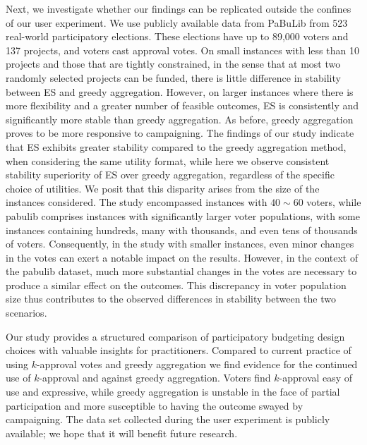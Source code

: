\documentclass[mnsc,blindrev]{informs3_freeuse} %
\newcommand{\mes}{ES}
\newcommand{\pabu}{PaBuLib}
\begin{document}
Next, we investigate whether our findings  can be replicated outside the confines of our user experiment. We use publicly available data from \pabu{} from 523 real-world participatory elections. These elections have up to 89,000 voters and 137 projects, and voters cast approval votes.  
On small instances with less than 10 projects and those that are tightly constrained, in the sense that at most two randomly selected projects can be funded, there is little difference in stability between \mes{} and greedy aggregation. However, on larger instances where there is more flexibility and a greater number of feasible outcomes, \mes{} is consistently and significantly more stable than greedy aggregation. As before, greedy aggregation proves 
 to be more responsive to campaigning.  
 The findings of our study indicate that \mes{} exhibits greater stability compared to the greedy aggregation method, when considering the same utility format, while here we observe consistent stability superiority of \mes{} over greedy aggregation, regardless of the specific choice of utilities.
 We posit that this disparity arises from the size of the instances considered. The study encompassed instances with $40\sim60$ voters, while pabulib comprises instances with significantly larger voter populations, with some instances containing hundreds, many with thousands, and even tens of thousands of voters. Consequently, in the study with smaller instances, even minor changes in the votes can exert a notable impact on the results. However, in the context of the pabulib dataset, much more substantial changes in the votes are necessary to produce a similar effect on the outcomes. This discrepancy in voter population size thus contributes to the observed differences in stability between the two scenarios.

Our study provides a structured comparison of participatory budgeting design choices with valuable insights for   practitioners. 
Compared to current practice of using $k$-approval votes and greedy aggregation we find evidence for the continued use of $k$-approval and against greedy aggregation. Voters find $k$-approval easy of use and expressive, while greedy aggregation is unstable in  the face of partial participation and more susceptible to having the outcome swayed by campaigning. 
The data set collected during the user experiment is publicly available; we  hope that it will benefit future research.  %
 
\end{document}
